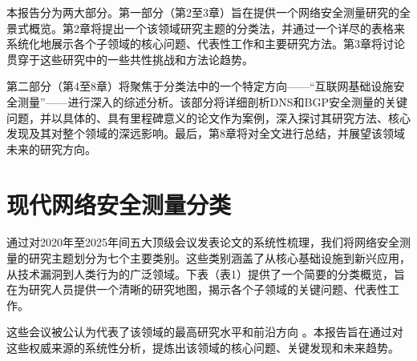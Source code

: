 \documentclass[conference]{IEEEtran}
\begin{document}
本报告分为两大部分。第一部分（第2至3章）旨在提供一个网络安全测量研究的全景式概览。第2章将提出一个该领域研究主题的分类法，并通过一个详尽的表格来系统化地展示各个子领域的核心问题、代表性工作和主要研究方法。第3章将讨论贯穿于这些研究中的一些共性挑战和方法论趋势。

第二部分（第4至8章）将聚焦于分类法中的一个特定方向——“互联网基础设施安全测量”——进行深入的综述分析。该部分将详细剖析DNS和BGP安全测量的关键问题，并以具体的、具有里程碑意义的论文作为案例，深入探讨其研究方法、核心发现及其对整个领域的深远影响。最后，第8章将对全文进行总结，并展望该领域未来的研究方向。


\section{现代网络安全测量分类}

通过对2020年至2025年间五大顶级会议发表论文的系统性梳理，我们将网络安全测量的研究主题划分为七个主要类别。这些类别涵盖了从核心基础设施到新兴应用，从技术漏洞到人类行为的广泛领域。下表（表1）提供了一个简要的分类概览，旨在为研究人员提供一个清晰的研究地图，揭示各个子领域的关键问题、代表性工作。

这些会议被公认为代表了该领域的最高研究水平和前沿方向 。本报告旨在通过对这些权威来源的系统性分析，提炼出该领域的核心问题、关键发现和未来趋势。
\end{document}

